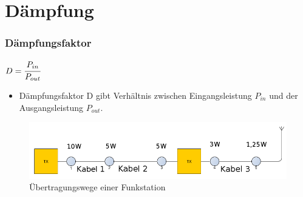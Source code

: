 

\subtitle{Technik Klasse E 10: \\
          Dezibel, Dämpfung \& Kabel \\[2em]}
\date{Stand 18.09.2017}



\section*{Dämpfung}

\begin{frame}
  \frametitle{Dämpfungsfaktor}
  \begin{center}
    \begin{minipage}{0.3\textwidth}
      \huge{$ D = \cfrac{P_{in}}{P_{out}}$}
    \end{minipage}
    \begin{minipage}{0.6\textwidth}
      \begin{itemize}
        \item Dämpfungsfaktor D gibt Verhältnis zwischen Eingangsleistung $P_{in}$
          und der Ausgangsleistung $P_{out}$.
      \end{itemize}
    \end{minipage}
    \vspace{1cm}
    \begin{figure}
      \includegraphics[width=\textwidth,height=.4\textheight,keepaspectratio]{e10/ubertragung.png}
      \caption{Übertragungswege einer Funkstation}
    \end{figure}
  \end{center}
\end{frame}

